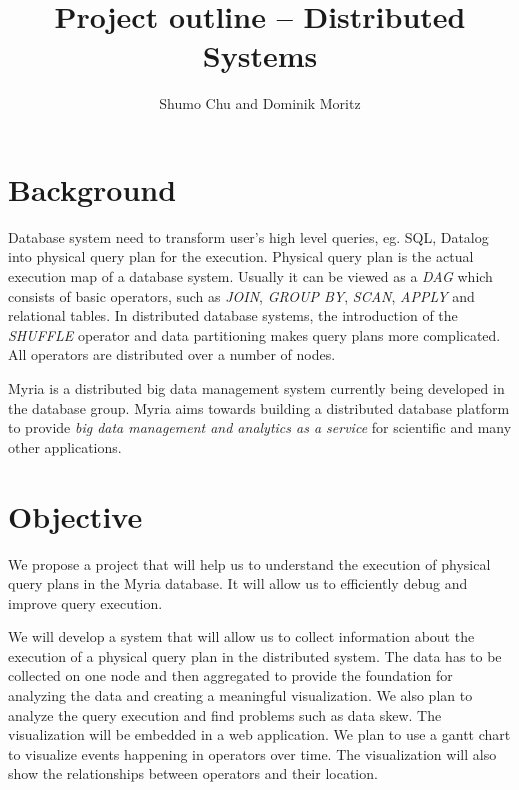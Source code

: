 \documentclass[11pt]{article}
\begin{document}

\title{Project outline \--- Distributed Systems}
\author{Shumo Chu and Dominik Moritz}
\date{}

\maketitle

\section{Background}

Database system need to transform user's high level queries, eg. SQL, Datalog into physical query plan for the execution. Physical query plan is the actual execution map of a database system. Usually it can be viewed as a \emph{DAG} which consists of basic operators, such as \emph{JOIN}, \emph{GROUP BY}, \emph{SCAN}, \emph{APPLY} and relational tables. In distributed database systems, the introduction of the \emph{SHUFFLE} operator and data partitioning makes query plans more complicated. All operators are distributed over a number of nodes.

Myria is a distributed big data management system currently being developed in the database group. Myria aims towards building a distributed database platform to provide \emph{big data management and analytics as a service} for scientific and many other applications.

\section{Objective}

We propose a project that will help us to understand the execution of physical query plans in the Myria database. It will allow us to efficiently debug and improve query execution.

We will develop a system that will allow us to collect information about the execution of a physical query plan in the distributed system. The data has to be collected on one node and then aggregated to provide the foundation for analyzing the data and creating a meaningful visualization. We also plan to analyze the query execution and find problems such as data skew. The visualization will be embedded in a web application. We plan to use a gantt chart to visualize events happening in operators over time. The visualization will also show the relationships between operators and their location.
\end{document}
